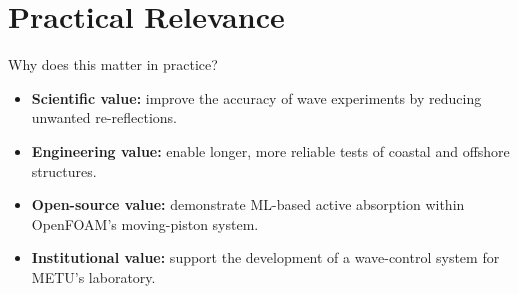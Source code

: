 \documentclass[aspectratio=43,11pt]{beamer}
\begin{document}
\section{Practical Relevance}
\begin{frame}[t]{Why does this matter in practice?}
\begin{center}
\end{center}
\vspace{2mm}
\begin{itemize}\setlength{\itemsep}{8pt}
  \item \textbf{Scientific value:}
        improve the accuracy of wave experiments by
        reducing unwanted re-reflections.
  \item \textbf{Engineering value:}
        enable longer, more reliable tests of coastal
        and offshore structures.
  \item \textbf{Open-source value:}
        demonstrate ML-based active absorption within OpenFOAM's moving-piston system.
  \item \textbf{Institutional value:}
        support the development of a wave-control
        system for METU's laboratory.
\end{itemize}
\end{frame}

\end{document}
